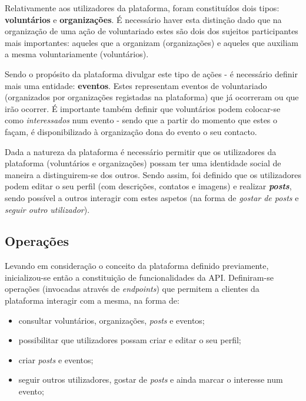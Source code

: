 \par \medskip

Relativamente aos utilizadores da plataforma, foram constituídos dois tipos: \textbf{voluntários} e \textbf{organizações}. É necessário haver esta distinção dado que na organização de uma ação de voluntariado estes são dois dos sujeitos participantes mais importantes: aqueles que a organizam (organizações) e aqueles que auxiliam a mesma voluntariamente (voluntários).

\par \medskip

Sendo o propósito da plataforma divulgar este tipo de ações - é necessário definir mais uma entidade: \textbf{eventos}. Estes representam eventos de voluntariado (organizados por organizações registadas na plataforma) que já ocorreram ou que irão ocorrer. É importante também definir que voluntários podem colocar-se como \textit{interessados} num evento - sendo que a partir do momento que estes o façam, é disponibilizado à organização dona do evento o seu contacto.

\par \medskip

Dada a natureza da plataforma é necessário permitir que os utilizadores da plataforma (voluntários e organizações) possam ter uma identidade social de maneira a distinguirem-se dos outros. Sendo assim, foi definido que os utilizadores podem editar o seu perfil (com descrições, contatos e imagens) e realizar \textit{\textbf{posts}}, sendo possível a outros interagir com estes aspetos (na forma de \textit{gostar de posts} e \textit{seguir outro utilizador}).
 
\subsection{Operações}

Levando em consideração o conceito da plataforma definido previamente, inicializou-se então a constituição de funcionalidades da API. Definiram-se operações (invocadas através de \textit{endpoints}) que permitem a clientes da plataforma interagir com a mesma, na forma de:

\begin{itemize}
	\item consultar voluntários, organizações, \textit{posts} e eventos;
	\item possibilitar que utilizadores possam criar e editar o seu perfil;
	\item criar \textit{posts} e eventos;
	\item seguir outros utilizadores, gostar de \textit{posts} e ainda marcar o interesse num evento;
\end{itemize}

